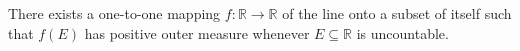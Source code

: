 There exists a one-to-one mapping $f : \mathbb{R} \to \mathbb{R}$ of the line onto a subset of itself such that $f(E)$ has positive outer measure whenever $E \subseteq \mathbb{R}$ is uncountable.
